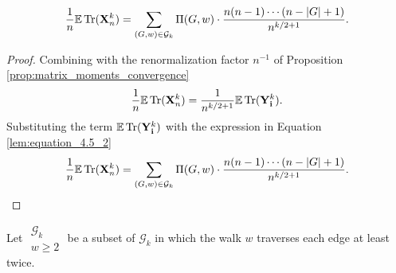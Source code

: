 \begin{lemma}
  \label{lem:equation_4.5_3}
  \[
  \frac{1}{n} {\mathbb{E}} \operatorname{Tr} (\mathbf{X}_n^k) = \sum_{(G,w) \in \mathcal{G}_k} \Pi (G,w) \cdot \frac{n (n-1) \cdots (n - |G| + 1)}{n^{k/2+1}}.
  \]
\end{lemma}
\begin{proof}
  Combining with the renormalization factor $n^{-1}$ of Proposition \ref{prop:matrix_moments_convergence}
  \[
  \frac{1}{n} {\mathbb{E}} \operatorname{Tr} (\mathbf{X}_n^k) = \frac{1}{n^{k/2+1}} {\mathbb{E}} \operatorname{Tr} (\mathbf{Y}_\mathbf{i}^k).
  \]
  Substituting the term ${\mathbb{E}} \operatorname{Tr} (\mathbf{Y}_\mathbf{i}^k)$ with the expression in Equation \ref{lem:equation_4.5_2}
  \[
  \frac{1}{n} {\mathbb{E}} \operatorname{Tr} (\mathbf{X}_n^k) = \sum_{\substack{(G,w) \in \mathcal{G}_k}} \Pi (G,w) \cdot \frac{n (n-1) \cdots (n - |G| + 1)}{n^{k/2+1}}.
  \]
\end{proof}
\begin{definition}
  \label{def:g_k_ge_2}
  Let $\substack{\mathcal{G}_k \\ w \geq 2}$ be a subset of $\mathcal{G}_k$ 
  in which the walk $w$ traverses each edge at least twice.
\end{definition}
